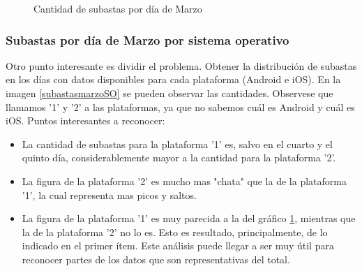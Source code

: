 \documentclass[a4paper, 12pt]{article}
\newcommand\tab[1][1cm]{\hspace*{#1}}
\begin{document}
	\FloatBarrier
		\begin{figure}
			\centering
		   		\caption{Cantidad de subastas por día de Marzo}
			   	\label{subastasmarzo}
		\end{figure}
	\FloatBarrier
			
	\subsubsection{Subastas por día de Marzo por sistema operativo}
	\tab Otro punto interesante es dividir el problema. Obtener la distribución de subastas en los días con datos disponibles para cada plataforma (Android e iOS). En la imagen \ref{subastasmarzoSO} se pueden observar las cantidades. Observese que llamamos '1' y '2' a las plataformas, ya que no sabemos cuál es Android y cuál es iOS.
	\tab Puntos interesantes a reconocer:
	
	\begin{itemize}
		\item La cantidad de subastas para la plataforma '1' es, salvo en el cuarto y el quinto día, considerablemente mayor a la cantidad para la plataforma '2'.
		\item La figura de la plataforma '2' es mucho mas "chata" que la de la plataforma '1', la cual representa mas picos y saltos.
		\item La figura de la plataforma '1' es muy parecida a la del gráfico \ref{subastasmarzo}, mientras que la de la plataforma '2' no lo es. Esto es resultado, principalmente, de lo indicado en el primer ítem. Este análisis puede llegar a ser muy útil para reconocer partes de los datos que son representativas del total.
	\end{itemize}
	
\end{document}
